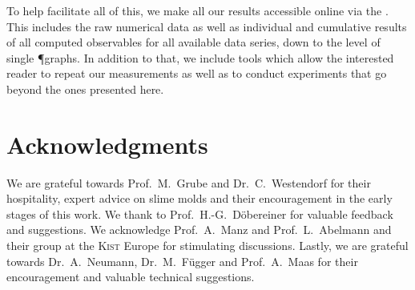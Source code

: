		To help facilitate all of this, we make all our results accessible online via the \SMGR. This includes the raw numerical data as well as individual and cumulative results of all computed observables for all available data series, down to the level of single \P graphs. In addition to that, we include tools which allow the interested reader to repeat our measurements as well as to conduct experiments that go beyond the ones presented here.

	\section{Acknowledgments}

		We are grateful towards Prof.~M.~Grube and Dr.~C.~Westendorf for their hospitality, expert advice on slime molds and their encouragement in the early stages of this work. We thank to Prof.~H.-G.~Döbereiner for valuable feedback and suggestions. We acknowledge Prof.~A.~Manz and Prof.~L.~Abelmann and their group at the \textsc{Kist} Europe for stimulating discussions. Lastly, we are grateful towards Dr.~A.~Neumann, Dr.~M.~Függer and Prof.~A.~Maas for their encouragement and valuable technical suggestions.

